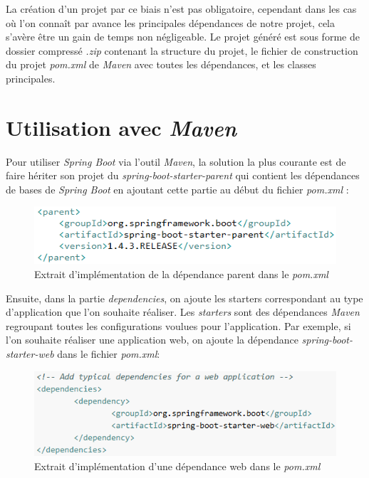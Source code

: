 \documentclass{polytech/polytech}
\begin{document}
La création d'un projet par ce biais n'est pas obligatoire, cependant dans les cas où l'on connaît par avance les principales dépendances de notre projet, cela s'avère être un gain de temps non négligeable. Le projet généré est sous forme de dossier compressé \textit{.zip} contenant la structure du projet, le fichier de construction du projet \textit{pom.xml} de \textit{Maven} avec toutes les dépendances, et les classes principales. 

\section{Utilisation avec \textit{Maven}}
\label{sec:utilisationMaven}

Pour utiliser \textit{Spring Boot} via l’outil \textit{Maven}, la solution la plus courante est de faire hériter son projet du \textit{spring-boot-starter-parent} qui contient les dépendances de bases de \textit{Spring Boot} en ajoutant cette partie au début du fichier \textit{pom.xml} :

\begin{figure}
	\includegraphics[scale=1]{images/parentSpringBoot}
	\caption{Extrait d'implémentation de la dépendance parent dans le \textit{pom.xml}}
	\label{fig:parentSpringBoot}
\end{figure}

Ensuite, dans la partie \textit{dependencies}, on ajoute les starters correspondant au type d’application que l’on souhaite réaliser. Les \textit{starters} sont des dépendances \textit{Maven} regroupant toutes les configurations voulues pour l’application.  Par exemple, si l'on souhaite réaliser une application web, on ajoute la dépendance \textit{spring-boot-starter-web} dans le fichier \textit{pom.xml}: 

\begin{figure}
	\includegraphics[scale=1]{images/dependencySpringBoot}
	\caption{Extrait d'implémentation d'une dépendance web dans le \textit{pom.xml}}
	\label{fig:dependencySpringBoot}
\end{figure}
\end{document}
